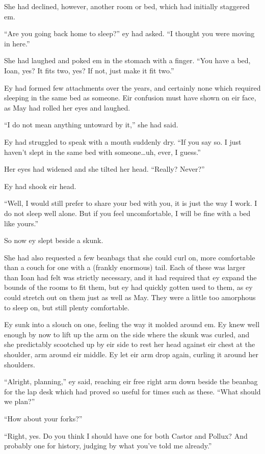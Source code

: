 She had declined, however, another room or bed, which had initially staggered em.

``Are you going back home to sleep?'' ey had asked. ``I thought you were moving in here.''

She had laughed and poked em in the stomach with a finger. ``You have a bed, Ioan, yes? It fits two, yes? If not, just make it fit two.''

Ey had formed few attachments over the years, and certainly none which required sleeping in the same bed as someone. Eir confusion must have shown on eir face, as May had rolled her eyes and laughed.

``I do not mean anything untoward by it,'' she had said.

Ey had struggled to speak with a mouth suddenly dry. ``If you say so. I just haven't slept in the same bed with someone\ldots uh, ever, I guess.''

Her eyes had widened and she tilted her head. ``Really? Never?''

Ey had shook eir head.

``Well, I would still prefer to share your bed with you, it is just the way I work. I do not sleep well alone. But if you feel uncomfortable, I will be fine with a bed like yours.''

So now ey slept beside a skunk.

She had also requested a few beanbags that she could curl on, more comfortable than a couch for one with a (frankly enormous) tail. Each of these was larger than Ioan had felt was strictly necessary, and it had required that ey expand the bounds of the rooms to fit them, but ey had quickly gotten used to them, as ey could stretch out on them just as well as May. They were a little too amorphous to sleep on, but still plenty comfortable.

Ey sunk into a slouch on one, feeling the way it molded around em. Ey knew well enough by now to lift up the arm on the side where the skunk was curled, and she predictably scootched up by eir side to rest her head against eir chest at the shoulder, arm around eir middle. Ey let eir arm drop again, curling it around her shoulders.

``Alright, planning,'' ey said, reaching eir free right arm down beside the beanbag for the lap desk which had proved so useful for times such as these. ``What should we plan?''

``How about your forks?''

``Right, yes. Do you think I should have one for both Castor and Pollux? And probably one for history, judging by what you've told me already.''

